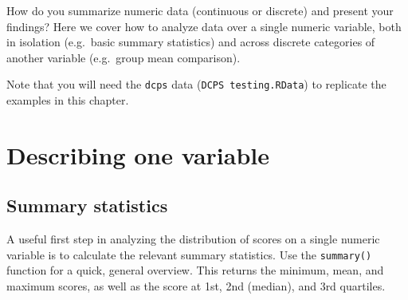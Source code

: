 \documentclass[
  12pt,
]{krantz}
\begin{document}
How do you summarize numeric data (continuous or discrete) and present your findings? Here we cover how to analyze data over a single numeric variable, both in isolation (e.g.~basic summary statistics) and across discrete categories of another variable (e.g.~group mean comparison).

Note that you will need the \texttt{dcps} data (\texttt{DCPS\ testing.RData}) to replicate the examples in this chapter.

\hypertarget{describing-one-variable}{%
\section{Describing one variable}\label{describing-one-variable}}

\hypertarget{summary-statistics}{%
\subsection{Summary statistics}\label{summary-statistics}}

A useful first step in analyzing the distribution of scores on a single numeric variable is to calculate the relevant summary statistics. Use the \texttt{summary()} function for a quick, general overview. This returns the minimum, mean, and maximum scores, as well as the score at 1st, 2nd (median), and 3rd quartiles.
\end{document}
